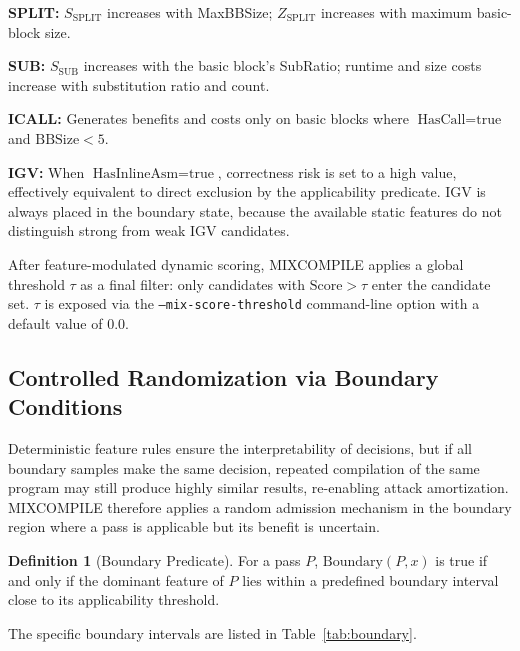 \documentclass[5p,times,authoryear]{elsarticle}
\theoremstyle{plain}
\theoremstyle{definition}
\newtheorem{definition}{Definition}
\theoremstyle{remark}
\begin{document}
\textbf{SPLIT:} $S_{\text{SPLIT}}$ increases with MaxBBSize; $Z_{\text{SPLIT}}$
increases with maximum basic-block size.

\textbf{SUB:} $S_{\text{SUB}}$ increases with the basic block's SubRatio; runtime and
size costs increase with substitution ratio and count.

\textbf{ICALL:} Generates benefits and costs only on basic blocks where
$\text{HasCall} = \text{true}$ and $\text{BBSize} < 5$.

\textbf{IGV:} When $\text{HasInlineAsm} = \text{true}$, correctness risk is set to a
high value, effectively equivalent to direct exclusion by the applicability predicate.
IGV is always placed in the boundary state, because the available static features do
not distinguish strong from weak IGV candidates.

After feature-modulated dynamic scoring, MIXCOMPILE applies a global threshold $\tau$
as a final filter: only candidates with $\text{Score} > \tau$ enter the candidate set.
$\tau$ is exposed via the \texttt{--mix-score-threshold} command-line option with a
default value of 0.0.

\subsection{Controlled Randomization via Boundary Conditions}
\label{sec:boundary}

Deterministic feature rules ensure the interpretability of decisions, but if all
boundary samples make the same decision, repeated compilation of the same program may
still produce highly similar results, re-enabling attack amortization. MIXCOMPILE
therefore applies a random admission mechanism in the boundary region where a pass is
applicable but its benefit is uncertain.

\begin{definition}[Boundary Predicate]
For a pass $P$, $\text{Boundary}(P, x)$ is true if and only if the dominant feature of
$P$ lies within a predefined boundary interval close to its applicability threshold.
\end{definition}

The specific boundary intervals are listed in Table~\ref{tab:boundary}.
\end{document}
